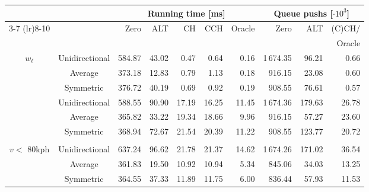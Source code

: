 \begin{tabular}{ccrrrrrrrr}
\toprule
 &  & \multicolumn{5}{c}{Running time [ms]} & \multicolumn{3}{c}{Queue pushs [$\cdot 10^3$]} \\ \cmidrule(lr){3-7} \cmidrule(lr){8-10}\multirow{2}{*}{$w_q$} & & \multirow{2}{*}{Zero} & \multirow{2}{*}{ALT} & \multirow{2}{*}{CH} & \multirow{2}{*}{CCH} & \multirow{2}{*}{Oracle} & \multirow{2}{*}{Zero} & \multirow{2}{*}{ALT} & (C)CH/ \\
 & & & & & & & & & Oracle \\
\midrule
\multirow{3}{*}{$w_{\ell}$} & Unidirectional &            584.87 & 43.02 &  0.47 &  0.64 &   0.16 &                    1\,674.35 &  96.21 &         0.66 \\
        & Average &            373.18 & 12.83 &  0.79 &  1.13 &   0.18 &                     916.15 &  23.08 &         0.60 \\
        & Symmetric &            376.72 & 40.19 &  0.69 &  0.92 &   0.19 &                     908.55 &  76.61 &         0.57 \\
\addlinespace
\multirow{3}{*}{$w_{\ell} \cdot 1.05$} & Unidirectional &            588.55 & 90.90 & 17.19 & 16.25 &  11.45 &                    1\,674.36 & 179.63 &        26.78 \\
        & Average &            365.82 & 33.22 & 19.34 & 18.66 &   9.96 &                     916.15 &  57.27 &        23.60 \\
        & Symmetric &            368.94 & 72.67 & 21.54 & 20.39 &  11.22 &                     908.55 & 123.77 &        20.72 \\
\addlinespace
\multirow{3}{*}{\shortstack{$w_{\ell} \cdot 1.5$ if\\ $v <$ 80kph}} & Unidirectional &            637.24 & 96.62 & 21.78 & 21.37 &  14.62 &                    1\,674.26 & 171.02 &        36.54 \\
        & Average &            361.83 & 19.50 & 10.92 & 10.94 &   5.34 &                     845.06 &  34.03 &        13.25 \\
        & Symmetric &            364.55 & 37.33 & 11.89 & 11.75 &   6.00 &                     836.44 &  57.93 &        11.53 \\
\bottomrule
\end{tabular}

